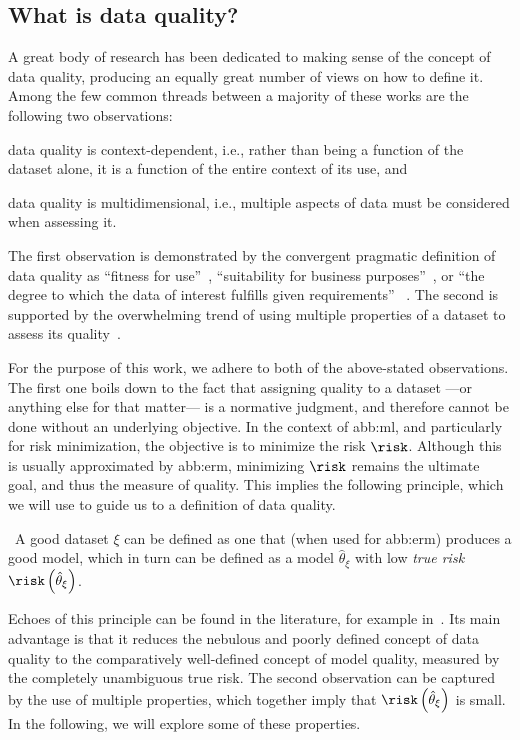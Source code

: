 \subsection{What is data quality?}\label{sub:what_is_data_quality}

A great body of research has been dedicated to making sense of the concept of data quality,
producing an equally great number of views on how to define it.
Among the few common threads between a majority of these works are the following two observations:
\begin{enumerate*}[label=(\arabic*)]
  \item data quality is context-dependent, i.e.,
        rather than being a function of the dataset alone,
        it is a function of the entire context of its use, and
  \item data quality is multidimensional, i.e.,
        multiple aspects of data must be considered when assessing it.
\end{enumerate*}
The first observation is demonstrated by the convergent pragmatic definition of data quality
as ``fitness for use''~\cite{sidiDataQualitySurvey2012},
``suitability for business purposes''~\cite{hagendorffLinkingHumanMachine2021},
or ``the degree to which the data of interest fulfills given requirements''%
~\cite{hassensteinDataQualityConcepts2022}.
The second is supported by the overwhelming trend of using multiple properties of a dataset
to assess its quality~\cite{%
  budachEffectsDataQuality2022,%
  mahantiDataQualityDimensions2019,%
  sidiDataQualitySurvey2012%
}.

For the purpose of this work, we adhere to both of the above-stated observations.
The first one boils down to the fact that
assigning quality to a dataset ---or anything else for that matter---
is a normative judgment, and therefore cannot be done without an underlying objective.
In the context of \gls{abb:ml}, and particularly for risk minimization,
the objective is to minimize the risk \(\risk\).
Although this is usually approximated by \gls{abb:erm},
minimizing \(\risk\) remains the ultimate goal, and thus the measure of quality.
This implies the following principle, which we will use
to guide us to a definition of data quality.

\begin{principle}\label{princple:performance_is_dq}\
  A good dataset \(\xi\) can be defined as one that (when used for \gls{abb:erm})
  produces a good model, which in turn can be defined
  as a model \(\hat{\theta}_{\xi}\) with low \emph{true risk}
  \(\risk\left( \hat{\theta}_{\xi} \right)\).
\end{principle}

Echoes of this principle can be found in the literature,
for example in~\cite{danilovDataQualityEstimation2023,camachoQualityQualityOut2023}.
Its main advantage is that it reduces the nebulous and poorly defined concept of data quality
to the comparatively well-defined concept of model quality,
measured by the completely unambiguous true risk.
The second observation can be captured by the use of multiple properties,
which together imply that \(\risk\left( \hat{\theta}_{\xi} \right)\)
is small.
In the following, we will explore some of these properties.
